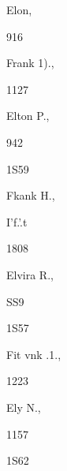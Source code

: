 \documentclass{book}
\begin{document}
Elon, 


916 




Frank 1)., 


1127 




Elton P., 


942 


1S59 


Fkank H., 


I'f.'.t 


1808 


Elvira R., 


SS9 


1S57 


Fit vnk .1., 


1223 




Ely N., 


1157 


1S62 
\end{document}
